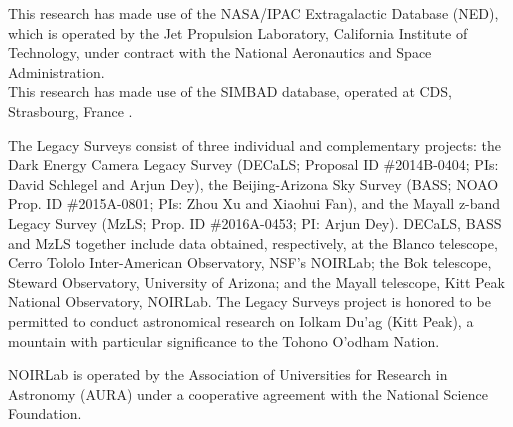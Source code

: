 \documentclass[twocolumn]{aastex62}
\begin{document}
This research has made use of the NASA/IPAC Extragalactic Database (NED),
which is operated by the Jet Propulsion Laboratory, California Institute of Technology, under contract with the National Aeronautics and Space Administration. \\
This research has made use of the SIMBAD database, operated at CDS, Strasbourg, France \citep{Wenger_2000}.

The Legacy Surveys consist of three individual and complementary projects: the Dark Energy Camera Legacy Survey (DECaLS; Proposal ID \#2014B-0404; PIs: David Schlegel and Arjun Dey), the Beijing-Arizona Sky Survey (BASS; NOAO Prop. ID \#2015A-0801; PIs: Zhou Xu and Xiaohui Fan), and the Mayall z-band Legacy Survey (MzLS; Prop. ID \#2016A-0453; PI: Arjun Dey). DECaLS, BASS and MzLS together include data obtained, respectively, at the Blanco telescope, Cerro Tololo Inter-American Observatory, NSF’s NOIRLab; the Bok telescope, Steward Observatory, University of Arizona; and the Mayall telescope, Kitt Peak National Observatory, NOIRLab. The Legacy Surveys project is honored to be permitted to conduct astronomical research on Iolkam Du’ag (Kitt Peak), a mountain with particular significance to the Tohono O’odham Nation.

NOIRLab is operated by the Association of Universities for Research in Astronomy (AURA) under a cooperative agreement with the National Science Foundation.
\end{document}
